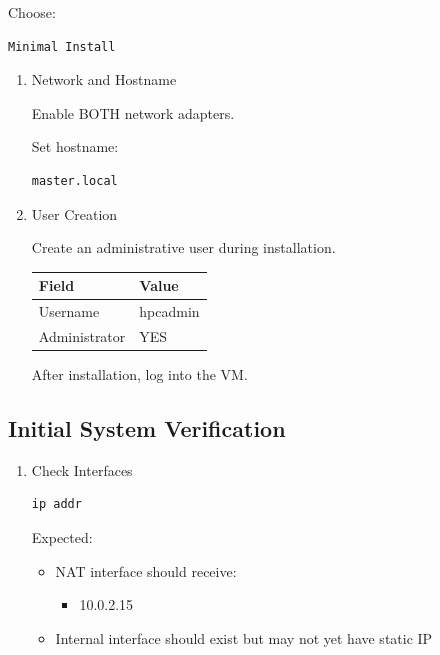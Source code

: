 \documentclass[11pt]{article}
\begin{document}
Choose:

\begin{verbatim}
Minimal Install
\end{verbatim}
\begin{enumerate}
\item Network and Hostname
\label{sec:orgeabe82a}

Enable BOTH network adapters.

Set hostname:

\begin{verbatim}
master.local
\end{verbatim}
\item User Creation
\label{sec:org2f95d95}

Create an administrative user during installation.

\begin{center}
\begin{tabular}{ll}
Field & Value\\
\hline
Username & hpcadmin\\
Administrator & YES\\
\end{tabular}
\end{center}
After installation, log into the VM.
\end{enumerate}
\subsection{Initial System Verification}
\label{sec:org5c8041d}
\begin{enumerate}
\item Check Interfaces
\label{sec:orge3ea144}

\begin{verbatim}
ip addr
\end{verbatim}

Expected:

\begin{itemize}
\item NAT interface should receive:
\begin{itemize}
\item 10.0.2.15
\end{itemize}
\item Internal interface should exist but may not yet have static IP
\end{itemize}
\end{enumerate}
\end{document}
